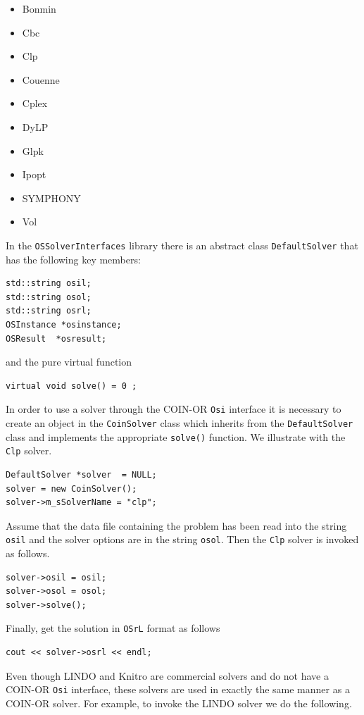 \documentclass[11pt]{article}
\renewcommand{\_}{{\char"5F}}
\renewcommand{\{}{{\char"7B}}
\renewcommand{\}}{{\char"7D}}
\renewcommand{\^}{{\char"0D}}
\renewcommand{\'}{{\char"0D}}
\newif\ifknitro \knitrofalse    %
\begin{document}
\begin{enumerate}[Step 1:]
\begin{itemize}
\item Bonmin
\item Cbc
\item Clp
\item Couenne
\item Cplex
\item DyLP
\item Glpk
\item Ipopt
\item SYMPHONY
\item Vol
\end{itemize}

In the {\tt OSSolverInterfaces} library there is an abstract class
{\tt DefaultSolver} that has the following key members:

\begin{verbatim}
std::string osil;
std::string osol;
std::string osrl;
OSInstance *osinstance;
OSResult  *osresult;
\end{verbatim}
and the pure virtual function
\begin{verbatim}
virtual void solve() = 0 ;
\end{verbatim}
In order to use a solver through the COIN-OR {\tt Osi} interface it is
necessary to create an object in the {\tt CoinSolver} class which inherits
from the {\tt DefaultSolver} class and implements the appropriate
{\tt solve()} function.  We illustrate with the {\tt Clp} solver.

\begin{verbatim}
DefaultSolver *solver  = NULL;
solver = new CoinSolver();
solver->m_sSolverName = "clp";
\end{verbatim}

Assume that the data file containing the problem has been read into
the string {\tt osil} and the solver options are in the string {\tt osol}.
Then the {\tt Clp} solver is invoked as follows.

\begin{verbatim}
solver->osil = osil;
solver->osol = osol;
solver->solve();
\end{verbatim}

Finally, get the solution in {\tt OSrL} format as follows

\begin{verbatim}
cout << solver->osrl << endl;
\end{verbatim}

\ifknitro   %
Even though LINDO and Knitro are commercial solvers and do not have a COIN-OR {\tt Osi} interface, these solvers are
used in exactly the same manner as a COIN-OR solver. For example, to invoke the LINDO solver we do the following.


\end{enumerate}
\end{document}
